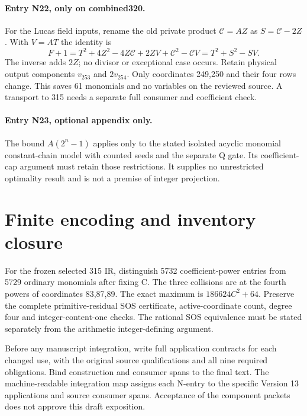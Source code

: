 \documentclass{article}
\begin{document}
\paragraph{Entry N22, only on combined320.}
For the Lucas field inputs, rename the old private product $\mathcal C=AZ$
as $S=\mathcal C-2Z$. With $V=AT$ the identity is
\[
 F+1=T^2+4Z^2-4Z\mathcal C+2ZV+\mathcal C^2-\mathcal CV
     =T^2+S^2-SV.
\]
The inverse adds $2Z$; no divisor or exceptional case occurs. Retain
physical output components $v_{253}$ and $2v_{254}$. Only coordinates
249,250 and their four rows change. This saves 61 monomials and no
variables on the reviewed source. A transport to 315 needs a separate
full consumer and coefficient check.

\paragraph{Entry N23, optional appendix only.}
The bound $A(2^n-1)$ applies only to the stated isolated acyclic monomial
constant-chain model with counted seeds and the separate Q gate. Its
coefficient-cap argument must retain those restrictions. It supplies no
unrestricted optimality result and is not a premise of integer projection.

\section{Finite encoding and inventory closure}
\label{outline:finite}
For the frozen selected 315 IR, distinguish 5732 coefficient-power entries
from 5729 ordinary monomials after fixing C. The three collisions are
at the fourth powers of coordinates 83,87,89. The exact maximum is
$186624C^2+64$. Preserve the complete primitive-residual SOS certificate,
active-coordinate count, degree four and integer-content-one checks.
The rational SOS equivalence must be stated separately from the arithmetic
integer-defining argument.

Before any manuscript integration, write full application contracts for
each changed use, with the original source qualifications and all nine
required obligations. Bind construction and consumer spans to the final
text. The machine-readable integration map assigns each N-entry to the
specific Version 13 applications and source consumer spans. Acceptance
of the component packets does not approve this draft exposition.
\end{document}
